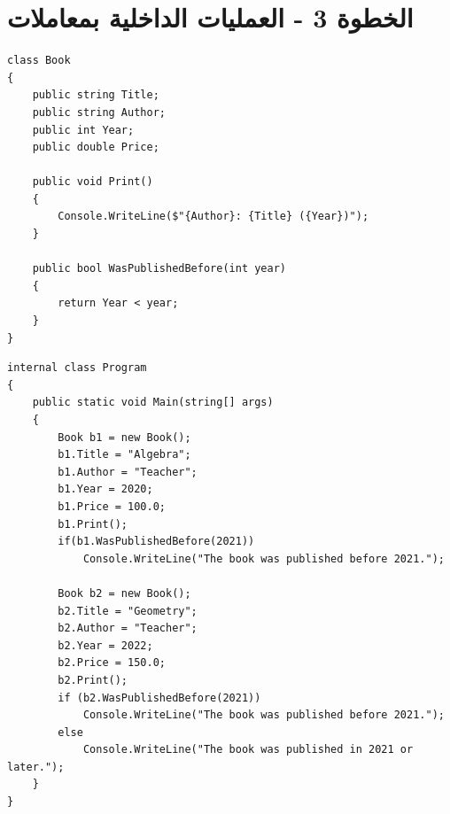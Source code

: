 \documentclass[11pt]{article}
\begin{document}
\clearpage
\section*{الخطوة 3 - العمليات الداخلية بمعاملات}
\begin{boxExample}
\begin{english}
\begin{verbatim}
class Book
{
    public string Title;
    public string Author;
    public int Year;
    public double Price;

    public void Print()
    {
        Console.WriteLine($"{Author}: {Title} ({Year})");
    }

    public bool WasPublishedBefore(int year)
    {
        return Year < year;
    }
}
\end{verbatim}
\end{english}
\end{boxExample}
\begin{boxExample}
\begin{english}
\begin{verbatim}
internal class Program
{
    public static void Main(string[] args)
    {
        Book b1 = new Book();
        b1.Title = "Algebra";
        b1.Author = "Teacher";
        b1.Year = 2020;
        b1.Price = 100.0;
        b1.Print();
        if(b1.WasPublishedBefore(2021))
            Console.WriteLine("The book was published before 2021.");

        Book b2 = new Book();
        b2.Title = "Geometry";
        b2.Author = "Teacher";
        b2.Year = 2022;
        b2.Price = 150.0;
        b2.Print();
        if (b2.WasPublishedBefore(2021))
            Console.WriteLine("The book was published before 2021.");
        else
            Console.WriteLine("The book was published in 2021 or later.");
    }
}
\end{verbatim}
\end{english}
\end{boxExample}

\clearpage
\end{document}
